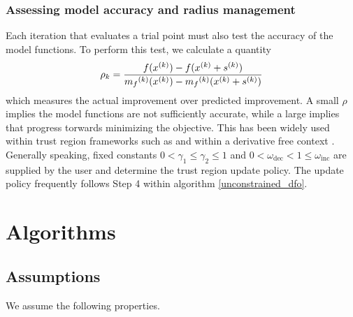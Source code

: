 \subsubsection{Assessing model accuracy and radius management}
Each iteration that evaluates a trial point must also test the accuracy of the model functions.
To perform this test, we calculate a quantity
\begin{equation}
\label{rho}
\rho_k = \frac{f({x}^{(k)}) - f({x}^{(k)}+{s}^{(k)})}{{{m}_f}^{(k)}({x}^{(k)}) - {{m}_f}^{(k)}({x}^{(k)}+{s}^{(k)})}
\end{equation}
which measures the actual improvement over predicted improvement.
A small $\rho$ implies the model functions are not sufficiently accurate, while a large implies that progress torwards minimizing the objective.
This has been widely used within trust region frameworks such as \cite{Conn:2000:TM:357813} and within a derivative free context \cite{DUMMY:intro_book}.
Generally speaking, fixed constants $0 < \gamma_1 \le \gamma_2 \le 1$ and $0 < \omega_{\text{dec}} < 1 \le \omega_{\text{inc}}$ are supplied by the user and determine the trust region update policy.
The update policy frequently follows Step 4 within algorithm \ref{unconstrained_dfo}.





\section{Algorithms}

\subsection{Assumptions}

We assume the following properties.

